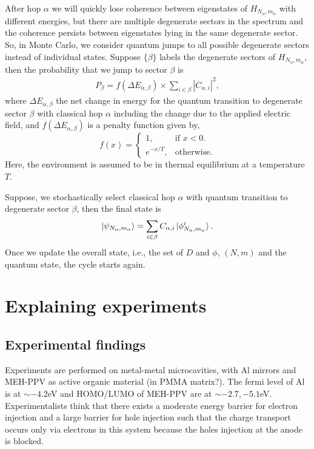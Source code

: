 \documentclass[a4paper,twocolumn]{revtex4-1} %
\begin{document}
After hop $\alpha$ we will quickly lose coherence between eigenstates 
of $H_{N_{\alpha},m_{\alpha}}$ with different 
energies, but
there are multiple degenerate sectors in the spectrum 
and 
 the coherence persists between
 eigenstates lying in the same degenerate sector.
So, in Monte Carlo, we consider quantum jumps to all possible degenerate sectors
instead of individual states.
Suppose $\{\beta\}$ labels the degenerate sectors
of $H_{N_{\alpha},m_{\alpha}}$, then
the probability that we jump to sector $\beta$
is
\begin{gather}
P_\beta = f(\Delta E_{\alpha,\beta}) \times \sum_{i\in\beta} |C_{\alpha,i}|^2,
\end{gather}
where 
$\Delta E_{\alpha,\beta}$ the net change in energy
for the quantum transition to degenerate sector $\beta$ with classical hop $\alpha$
 including the change due to the applied electric field,
 and 
 $f(\Delta E_{\alpha,\beta})$ is a penalty function given by,
\begin{equation}
\nonumber
  f(x)=\begin{cases}
    1, & \text{if $x<0$}.\\
    e^{-x/{T}}, & \text{otherwise}.
  \end{cases}
\end{equation}
Here, the environment is assumed to be in thermal equilibrium at
a temperature $T$.

Suppose, we stochastically select 
classical hop $\alpha$ with quantum transition to degenerate sector $\beta$,
 then
the final state is
\begin{gather}
\ket{\psi_{N_{\alpha},m_{\alpha}}}= \sum_{i\in\beta} C_{\alpha,i} \ket{\phi_{N_{\alpha},m_{\alpha}}^i}.
\end{gather}
Once we update the overall state, i.e., the set of $D$ and $\phi$, $(N,m)$ and the quantum state, the cycle starts again.




\section{Explaining experiments}

\subsection{Experimental findings}
Experiments are performed on metal-metal microcavities, with Al mirrors and MEH-PPV as active organic material (in PMMA matrix?). 
The fermi level of Al is at $\sim -4.2$eV and 
HOMO/LUMO of MEH-PPV are at $\sim -2.7,-5.1$eV.
Experimentalists think that there exists a moderate energy barrier for electron injection and a large barrier for hole injection such that the charge transport occurs only via electrons in this system because the holes injection at the anode is blocked.
\end{document}
